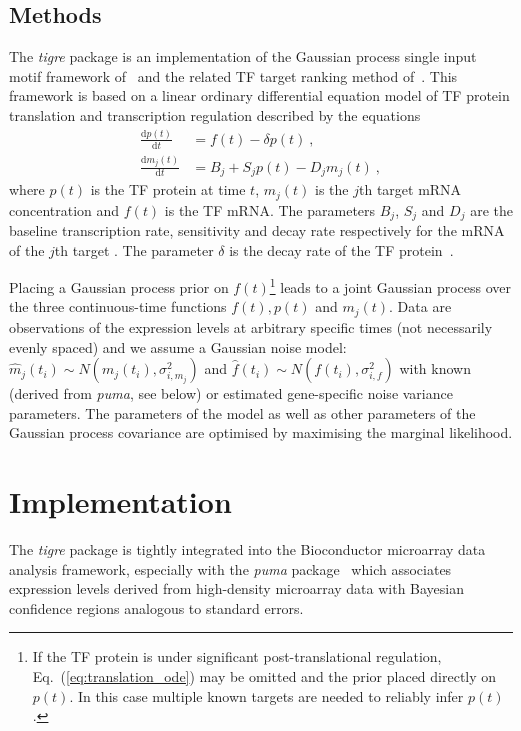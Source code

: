 \documentclass{bioinfo}
\newcommand{\tigre}{\emph{tigre}}
\begin{document}
\begin{methods}
\section{Methods}

The \tigre{} package is an implementation of the Gaussian process
single input motif framework of~\citet{Gao2008} and the related TF
target ranking method of~\citet{Honkela2010PNAS}.  This framework is
based on a linear ordinary differential equation model of TF protein
translation and transcription regulation described by the equations
\begin{align}
  \frac{\mathrm{d}p(t)}{\mathrm{d}t} & = f(t) - \delta
  p(t) \ , \label{eq:translation_ode} \\
  \frac{\mathrm{d}m_j(t)}{\mathrm{d}t} & = B_j+S_j p(t)-D_j m_j(t) \ , \label{eq:transcription_ode}
\end{align}
where $p(t)$ is the TF protein at time $t$, $m_j(t)$ is the $j$th target mRNA
concentration and $f(t)$ is the TF mRNA. The parameters $B_j$, $S_j$ and $D_j$ are the
baseline transcription rate, sensitivity and decay rate respectively
for the mRNA of the $j$th target \citep[as described by][]{Barenco2006a}.
The parameter $\delta$ is the decay rate of the TF
protein~\citep{Honkela2010PNAS}. 

Placing a Gaussian process prior on $f(t)$\footnote{If the TF protein
  is under significant post-translational regulation,
  Eq.~(\ref{eq:translation_ode}) may be omitted and the prior placed
  directly on $p(t)$.  In this case multiple known targets are needed
  to reliably infer $p(t)$.} leads to a joint Gaussian process over
the three continuous-time functions $f(t),p(t)$ and $m_j(t)$.  Data are observations of the expression levels at arbitrary specific times (not necessarily evenly spaced) and we assume a Gaussian noise model: $\hat{m}_j(t_i) \sim N(m_j(t_i),\sigma_{i,m_j}^2)$ and $\hat{f}(t_i) \sim N(f(t_i),\sigma_{i,f}^2)$ with known (derived from \emph{puma}, see below) or estimated gene-specific noise variance parameters. The parameters of the model as well as other parameters of the Gaussian process covariance are
optimised by maximising the marginal likelihood.
\end{methods}

\section{Implementation}

The \tigre{} package is tightly integrated into the Bioconductor
microarray data analysis framework, especially with the \emph{puma}
package~\citep{Pearson2009} which associates expression levels derived from
high-density microarray data with Bayesian confidence regions analogous to standard errors.
\end{document}
